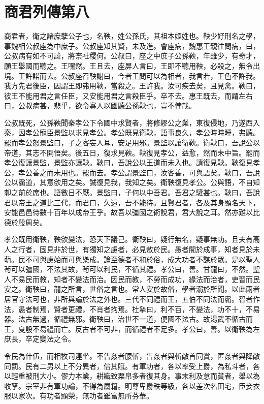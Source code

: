 \chapter{商君列傳第八}

商君者，衛之諸庶孽公子也，名鞅，姓公孫氏，其祖本姬姓也。鞅少好刑名之學，事魏相公叔座為中庶子。公叔座知其賢，未及進。會座病，魏惠王親往問病，曰，公叔病有如不可諱，將柰社稷何。公叔曰，座之中庶子公孫鞅，年雖少，有奇才，願王舉國而聽之。王嘿然。王且去，座屏人言曰，王即不聽用鞅，必殺之，無令出境。王許諾而去。公叔座召鞅謝曰，今者王問可以為相者，我言若，王色不許我。我方先君後臣，因謂王即弗用鞅，當殺之。王許我。汝可疾去矣，且見禽。鞅曰，彼王不能用君之言任臣，又安能用君之言殺臣乎。卒不去。惠王既去，而謂左右曰，公叔病甚，悲乎，欲令寡人以國聽公孫鞅也，豈不悖哉。

公叔既死，公孫鞅聞秦孝公下令國中求賢者，將修繆公之業，東復侵地，乃遂西入秦，因孝公寵臣景監以求見孝公。孝公既見衛鞅，語事良久，孝公時時睡，弗聽。罷而孝公怒景監曰，子之客妄人耳，安足用邪。景監以讓衛鞅。衛鞅曰，吾說公以帝道，其志不開悟矣。後五日，復求見鞅。鞅復見孝公，益愈，然而未中旨。罷而孝公復讓景監，景監亦讓鞅。鞅曰，吾說公以王道而未入也。請復見鞅。鞅復見孝公，孝公善之而未用也。罷而去。孝公謂景監曰，汝客善，可與語矣。鞅曰，吾說公以霸道，其意欲用之矣。誠復見我，我知之矣。衛鞅復見孝公。公與語，不自知厀之前於席也。語數日不厭。景監曰，子何以中吾君。吾君之驩甚也。鞅曰，吾說君以帝王之道比三代，而君曰，久遠，吾不能待。且賢君者，各及其身顯名天下，安能邑邑待數十百年以成帝王乎。故吾以彊國之術說君，君大說之耳。然亦難以比德於殷周矣。

孝公既用衛鞅，鞅欲變法，恐天下議己。衛鞅曰，疑行無名，疑事無功。且夫有高人之行者，固見非於世，有獨知之慮者，必見敖於民。愚者闇於成事，知者見於未萌。民不可與慮始而可與樂成。論至德者不和於俗，成大功者不謀於眾。是以聖人茍可以彊國，不法其故，茍可以利民，不循其禮。孝公曰，善。甘龍曰，不然。聖人不易民而教，知者不變法而治。因民而教，不勞而成功，緣法而治者，吏習而民安之。衛鞅曰，龍之所言，世俗之言也。常人安於故俗，學者溺於所聞。以此兩者居官守法可也，非所與論於法之外也。三代不同禮而王，五伯不同法而霸。智者作法，愚者制焉，賢者更禮，不肖者拘焉。杜摯曰，利不百，不變法，功不十，不易器。法古無過，循禮無邪。衛鞅曰，治世不一道，便國不法古。故湯武不循古而王，夏殷不易禮而亡。反古者不可非，而循禮者不足多。孝公曰，善。以衛鞅為左庶長，卒定變法之令。

令民為什伍，而相牧司連坐。不告姦者腰斬，告姦者與斬敵首同賞，匿姦者與降敵同罰。民有二男以上不分異者，倍其賦。有軍功者，各以率受上爵，為私斗者，各以輕重被刑大小。僇力本業，耕織致粟帛多者復其身。事末利及怠而貧者，舉以為收孥。宗室非有軍功論，不得為屬籍。明尊卑爵秩等級，各以差次名田宅，臣妾衣服以家次。有功者顯榮，無功者雖富無所芬華。

